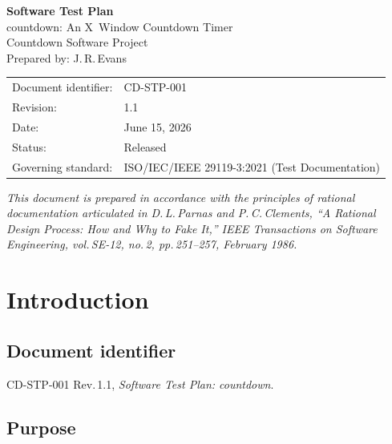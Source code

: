 \documentclass[12pt]{article}
\begin{document}
\begin{titlepage}
  \centering
  \vspace*{2cm}
  {\Huge\bfseries\color{cdteal} Software Test Plan\\[0.5em]}
  {\Large countdown: An X~Window Countdown Timer}\\[2em]
  {\large Countdown Software Project}\\[0.5em]
  {\normalsize Prepared by: J.\,R.\,Evans}\\[2em]
  \begin{tabular}{ll}
    Document identifier: & CD-STP-001                                      \\
    Revision:            & 1.1                                             \\
    Date:                & June 15, 2026                                   \\
    Status:              & Released                                        \\
    Governing standard:  & ISO/IEC/IEEE 29119-3:2021 (Test Documentation)  \\
  \end{tabular}
  \vfill
  {\small\textit{This document is prepared in accordance with the
  principles of rational documentation articulated in
  D.\,L.\,Parnas and P.\,C.\,Clements, ``A Rational Design Process:
  How and Why to Fake It,'' \textit{IEEE Transactions on Software
  Engineering}, vol.\,SE-12, no.\,2, pp.\,251--257, February 1986.}}
\end{titlepage}

\tableofcontents
\clearpage

\section{Introduction}

\subsection{Document identifier}

CD-STP-001 Rev.\,1.1, \textit{Software Test Plan: countdown}.

\subsection{Purpose}
\end{document}
